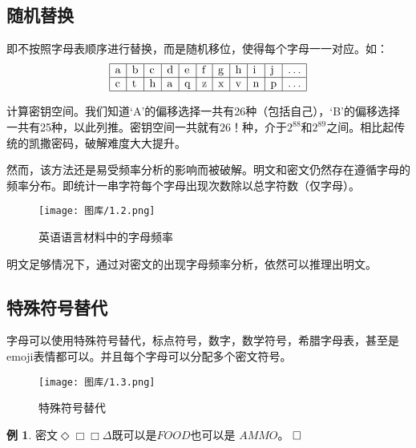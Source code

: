\documentclass{article}
\theoremstyle{definition}
\newtheorem{example}{\indent 例}
\begin{document}
\subsection{随机替换}
即不按照字母表顺序进行替换，而是随机移位，使得每个字母一一对应。如：
$$
\begin{array}{|l|l|l|l|l|l|l|l|l|l|l|}
\hline \mathrm{a} & \mathrm{b} & \mathrm{c} & \mathrm{d} & \mathrm{e} & \mathrm{f} & \mathrm{g} & \mathrm{h} & \mathrm{i} & \mathrm{j} & \ldots \\
\hline \mathrm{c} & \mathrm{t} & \mathrm{h} & \mathrm{a} & \mathrm{q} & \mathrm{z} & \mathrm{x} & \mathrm{v} & \mathrm{n} & \mathrm{p} & \ldots \\
\hline
\end{array}
$$	

计算密钥空间。我们知道‘A’的偏移选择一共有26种（包括自己），‘B’的偏移选择一共有25种，以此列推。密钥空间一共就有$26！$种，介于$2^{88}$和$2^{89}$之间。相比起传统的凯撒密码，破解难度大大提升。

然而，该方法还是易受频率分析的影响而被破解。明文和密文仍然存在遵循字母的频率分布。即统计一串字符每个字母出现次数除以总字符数（仅字母）。
\begin{figure}[H] %
\centering %
\texttt{[image: 图库/1.2.png]} %
\caption{英语语言材料中的字母频率} %
\label{Fig.main2} %
\end{figure}

明文足够情况下，通过对密文的出现字母频率分析，依然可以推理出明文。

\clearpage

\subsection{特殊符号替代}

字母可以使用特殊符号替代，标点符号，数字，数学符号，希腊字母表，甚至是emoji表情都可以。并且每个字母可以分配多个密文符号。

\begin{figure}[H] %
\centering %
\texttt{[image: 图库/1.3.png]} %
\caption{特殊符号替代} %
\label{Fig.main2} %
\end{figure}

\begin{example}

密文$\Diamond\Box \Box \Delta $既可以是$FOOD$也可以是 $AMMO$。 $\hfill\square$ 

\end{example}
\end{document}
